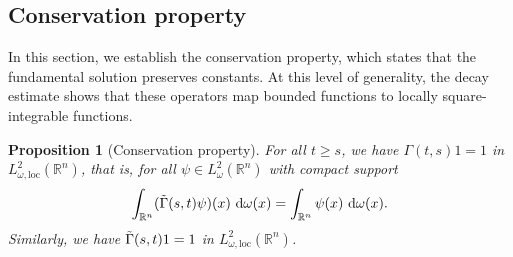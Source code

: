 \documentclass[12pt, letterpaper]{amsart}
\newtheorem{prop}[thm]{Proposition}
\theoremstyle{definition}
\theoremstyle{remark}
\numberwithin{equation}{section}
\begin{document}
\subsection{Conservation property}
In this section, we establish the conservation property, which states that the fundamental solution preserves constants. At this level of generality, the decay estimate shows that these operators map bounded functions to locally square-integrable functions.
\begin{prop}[Conservation property]\label{prop:consproperty}
    For all $ t \ge s$, we have $\Gamma(t,s)1=1$ in $L^2_{\omega,\mathrm{loc}}(\mathbb{R}^n)$, that is, for all $\psi \in L^2_\omega(\mathbb{R}^n)$ with compact support
    $$ \int_{\mathbb{R}^n}(\Tilde{\Gamma}(s,t)\psi)(x) \  \mathrm{d}\omega(x)=\int_{\mathbb{R}^n}\psi(x) \ \mathrm{d}\omega(x). $$
    Similarly, we have $\Tilde{\Gamma}(s,t)1=1$ in $L^2_{\omega,\mathrm{loc}}(\mathbb{R}^n)$.
\end{prop}
\end{document}
